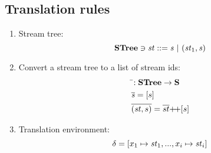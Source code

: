 \subsection{Translation rules}
\begin{enumerate}[(1)]
	\item Stream tree: $$ \STree \ni \st ::= \s \ | \ (\st_1,\s) $$
	\item Convert a stream tree to a list of  stream ids:
	      \begin{align*}
	      &\bar{}: \STree \-> \S \\
	      &\overline{\s} = [s] \\
	      &\overline{(\st,s)} = \overline{st} {\++} [s]
	      \end{align*}

	
	\item Translation environment: $$\del = [x_1 \|-> \st_1,..., x_i \|-> {\st_i}] $$ 
	
	
\end{enumerate}

